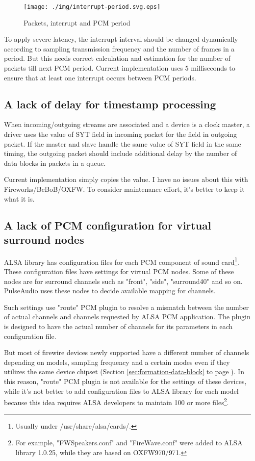 \documentclass[onecolumn]{article}
\begin{document}
\begin{figure}[H]
	\centering
	\texttt{[image: ./img/interrupt-period.svg.eps]}
	\caption{{Packets, interrupt and PCM period}}
	\label{fig:interrupt-period}
\end{figure}

To apply severe latency, the interrupt interval should be changed dynamically according to sampling transmission frequency and the number of frames in a period. But this needs correct calculation and estimation for the number of packets till next PCM period. Current implementation uses 5 milliseconds to ensure that at least one interrupt occurs between PCM periods.

\subsection{A lack of delay for timestamp processing}

When incoming/outgoing streams are associated and a device is a clock master, a driver uses the value of SYT field in incoming packet for the field in outgoing packet. If the master and slave handle the same value of SYT field in the same timing, the outgoing packet should include additional delay by the number of data blocks in packets in a queue. 

Current implementation simply copies the value. I have no issues about this with Fireworks/BeBoB/OXFW. To consider maintenance effort, it's better to keep it what it is.

\subsection{A lack of PCM configuration for virtual surround nodes}

ALSA library has configuration files for each PCM component of sound card\footnote{Usually under /usr/share/alsa/cards/.}. These configuration files have settings for virtual PCM nodes. Some of these nodes are for surround channels such as "front", "side", "surround40" and so on. PulseAudio uses these nodes to decide available mapping for channels.

Such settings use "route" PCM plugin to resolve a mismatch between the number of actual channels and channels requested by ALSA PCM application. The plugin is designed to have the actual number of channels for its parameters in each configuration file.

But most of firewire devices newly supported have a different number of channels depending on models, sampling frequency and a certain modes even if they utilizes the same device chipset (Section \ref{sec:formation-data-block} to page \pageref{sec:formation-data-block}). In this reason, "route" PCM plugin is not available for the settings of these devices, while it's not better to add configuration files to ALSA library for each model because this idea requires ALSA developers to maintain 100 or more files\footnote{For example, "FWSpeakers.conf" and "FireWave.conf" were added to ALSA library 1.0.25, while they are based on OXFW970/971.}.
\end{document}
